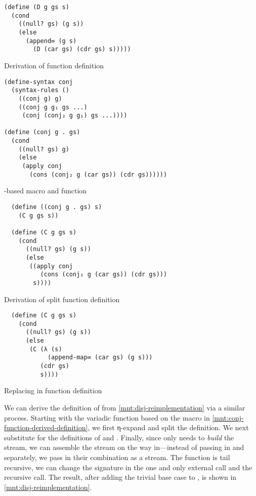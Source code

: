 \documentclass[sigplan,balance,pbalance,natbib=false]{acmart}
\begin{document}
\begin{listing}
\begin{verbatim}
(define (D g gs s)
  (cond
    ((null? gs) (g s))
    (else
      (append∞ (g s)
        (D (car gs) (cdr gs) s)))))
\end{verbatim}
  \caption{Derivation of  function definition}\label{mnt:disj-substituted-through}
\end{listing}

\begin{listing}
\begin{verbatim}
(define-syntax conj
  (syntax-rules ()
    ((conj g) g)
    ((conj g g₁ gs ...)
     (conj (conj₂ g g₁) gs ...))))

(define (conj g . gs)
  (cond
    ((null? gs) g)
    (else
     (apply conj
       (cons (conj₂ g (car gs)) (cdr gs))))))
\end{verbatim}
  \caption{-based  macro and function}
  \label{mnt:conj-function-derived-definition}
\end{listing}

\begin{listing}
\begin{verbatim}
  (define ((conj g . gs) s)
    (C g gs s))

  (define (C g gs s)
    (cond
      ((null? gs) (g s))
      (else
       ((apply conj
          (cons (conj₂ g (car gs)) (cdr gs)))
        s))))
\end{verbatim}
  \caption{Derivation of split  function definition}\label{mnt:conj-substituted-through}
\end{listing}

\begin{listing}
\begin{verbatim}
  (define (C g gs s)
    (cond
      ((null? gs) (g s))
      (else
       (C (λ (s)
            (append-map∞ (car gs) (g s)))
          (cdr gs)
          s))))
\end{verbatim}
  \caption{Replacing  in  function definition}\label{mnt:C-substituted-through}
\end{listing}

We can derive the definition of  from
\cref{mnt:disj-reimplementation} via a similar process. Starting with
the variadic function based on the macro in
\cref{mnt:conj-function-derived-definition}, we first η-expand and
split the definition. We next substitute for the definitions
of  and . Finally,
since  only needs  to \emph{build} the
stream, we can assemble the stream on the way in---instead of passing
in  and  separately, we pass in their
combination as a stream. The function is tail recursive, we can change
the signature in the one and only external call and the recursive
call. The result, after adding the trivial base case
to , is shown in \cref{mnt:disj-reimplementation}.
\end{document}
